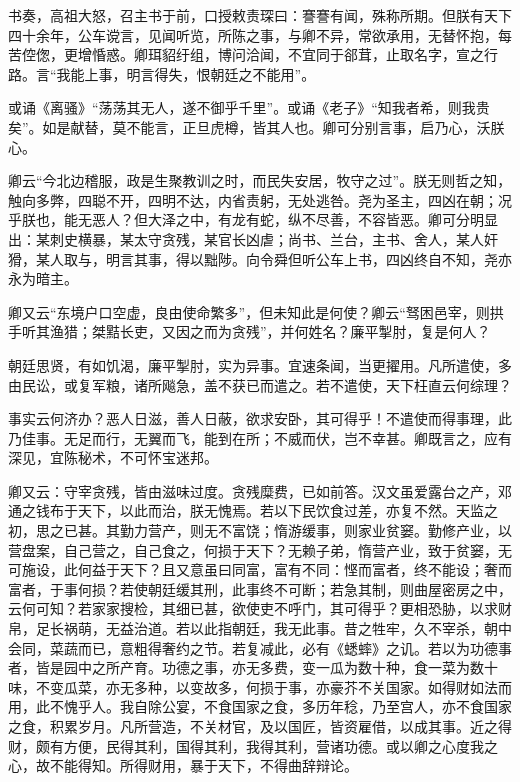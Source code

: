 \documentclass[12pt,UTF8]{ctexbook}
\begin{document}
书奏，高祖大怒，召主书于前，口授敕责琛曰：謇謇有闻，殊称所期。但朕有天下四十余年，公车谠言，见闻听览，所陈之事，与卿不异，常欲承用，无替怀抱，每苦倥偬，更增惛惑。卿珥貂纡组，博问洽闻，不宜同于郤茸，止取名字，宣之行路。言“我能上事，明言得失，恨朝廷之不能用”。

或诵《离骚》“荡荡其无人，遂不御乎千里”。或诵《老子》“知我者希，则我贵矣”。如是献替，莫不能言，正旦虎樽，皆其人也。卿可分别言事，启乃心，沃朕心。

卿云“今北边稽服，政是生聚教训之时，而民失安居，牧守之过”。朕无则哲之知，触向多弊，四聪不开，四明不达，内省责躬，无处逃咎。尧为圣主，四凶在朝；况乎朕也，能无恶人？但大泽之中，有龙有蛇，纵不尽善，不容皆恶。卿可分明显出：某刺史横暴，某太守贪残，某官长凶虐；尚书、兰台，主书、舍人，某人奸猾，某人取与，明言其事，得以黜陟。向令舜但听公车上书，四凶终自不知，尧亦永为暗主。

卿又云“东境户口空虚，良由使命繁多”，但未知此是何使？卿云“驽困邑宰，则拱手听其渔猎；桀黠长吏，又因之而为贪残”，并何姓名？廉平掣肘，复是何人？

朝廷思贤，有如饥渴，廉平掣肘，实为异事。宜速条闻，当更擢用。凡所遣使，多由民讼，或复军粮，诸所飚急，盖不获已而遣之。若不遣使，天下枉直云何综理？

事实云何济办？恶人日滋，善人日蔽，欲求安卧，其可得乎！不遣使而得事理，此乃佳事。无足而行，无翼而飞，能到在所；不威而伏，岂不幸甚。卿既言之，应有深见，宜陈秘术，不可怀宝迷邦。

卿又云：守宰贪残，皆由滋味过度。贪残糜费，已如前答。汉文虽爱露台之产，邓通之钱布于天下，以此而治，朕无愧焉。若以下民饮食过差，亦复不然。天监之初，思之已甚。其勤力营产，则无不富饶；惰游缓事，则家业贫窭。勤修产业，以营盘案，自己营之，自己食之，何损于天下？无赖子弟，惰营产业，致于贫窭，无可施设，此何益于天下？且又意虽曰同富，富有不同：悭而富者，终不能设；奢而富者，于事何损？若使朝廷缓其刑，此事终不可断；若急其制，则曲屋密房之中，云何可知？若家家搜检，其细已甚，欲使吏不呼门，其可得乎？更相恐胁，以求财帛，足长祸萌，无益治道。若以此指朝廷，我无此事。昔之牲牢，久不宰杀，朝中会同，菜蔬而已，意粗得奢约之节。若复减此，必有《蟋蟀》之讥。若以为功德事者，皆是园中之所产育。功德之事，亦无多费，变一瓜为数十种，食一菜为数十味，不变瓜菜，亦无多种，以变故多，何损于事，亦豪芥不关国家。如得财如法而用，此不愧乎人。我自除公宴，不食国家之食，多历年稔，乃至宫人，亦不食国家之食，积累岁月。凡所营造，不关材官，及以国匠，皆资雇借，以成其事。近之得财，颇有方便，民得其利，国得其利，我得其利，营诸功德。或以卿之心度我之心，故不能得知。所得财用，暴于天下，不得曲辞辩论。
\end{document}
